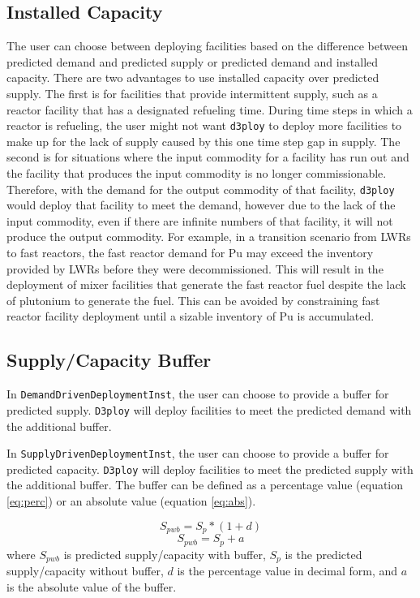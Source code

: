 \documentclass[11pt,letterpaper]{article}
\newcommand{\deploy}{\texttt{d3ploy}\xspace}%
\newcommand{\Deploy}{\texttt{D3ploy}\xspace}%
\begin{document}
\subsection{\textbf{Installed Capacity}}
The user can choose between deploying facilities based on the difference 
between predicted demand and predicted supply or predicted demand and 
installed capacity. 
There are two advantages to use installed capacity over predicted 
supply. 
The first is for facilities that provide intermittent supply, such as a 
reactor facility that has a designated refueling time. 
During time steps in which a reactor is refueling, the user might not 
want \deploy to deploy more facilities to make up for the lack of supply
caused by this one time step gap in supply. 
The second is for situations where the input commodity for a facility has
run out and the facility that produces the input commodity 
is no longer commissionable. 
Therefore, with the demand for the output commodity of that facility, \deploy
would deploy that facility to meet the demand, however due to the lack of 
the input commodity, even if there are infinite numbers of that facility, 
it will not produce the output commodity. 
For example, in a transition scenario from LWRs to fast reactors, the fast 
reactor demand for Pu may exceed the inventory provided by LWRs before 
they were decommissioned. 
This will result in the deployment of mixer facilities that generate the 
fast reactor fuel despite the lack of plutonium to generate the fuel. 
This can be avoided by constraining fast reactor facility deployment 
until a sizable inventory of Pu is accumulated. 

\subsection{\textbf{Supply/Capacity Buffer}}
In \texttt{DemandDrivenDeploymentInst}, the user can choose to provide a
buffer for predicted supply.
\Deploy will deploy facilities to meet the predicted demand with the 
additional buffer. 

In \texttt{SupplyDrivenDeploymentInst}, the user can choose to 
provide a buffer for predicted capacity.
\Deploy will deploy facilities to meet the predicted supply with the 
additional buffer. 
The buffer can be defined as a percentage value (equation \ref{eq:perc}) 
or an absolute value (equation \ref{eq:abs}).  

\begin{equation}
    \label{eq:perc}
    S_{pwb} = S_{p}*(1+d)
\end{equation}
\begin{equation}
    \label{eq:abs}
    S_{pwb} = S_{p}+a
\end{equation}
where $S_{pwb}$ is predicted supply/capacity with buffer, 
$S_p$ is the predicted supply/capacity without buffer, 
$d$ is the percentage value in decimal form, 
and $a$ is the absolute value of the buffer. 
\end{document}
